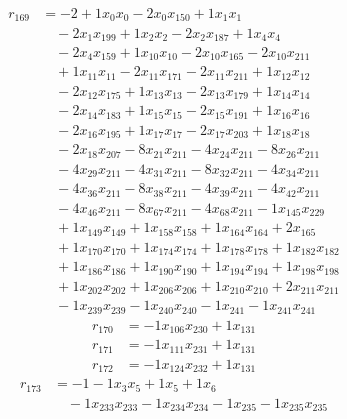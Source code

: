 \[\begin{aligned}
r_{169} &= - 2 + 1 x_{0} x_{0} - 2 x_{0} x_{150} + 1 x_{1} x_{1} \\
 &\quad - 2 x_{1} x_{199} + 1 x_{2} x_{2} - 2 x_{2} x_{187} + 1 x_{4} x_{4} \\
 &\quad - 2 x_{4} x_{159} + 1 x_{10} x_{10} - 2 x_{10} x_{165} - 2 x_{10} x_{211} \\
 &\quad + 1 x_{11} x_{11} - 2 x_{11} x_{171} - 2 x_{11} x_{211} + 1 x_{12} x_{12} \\
 &\quad - 2 x_{12} x_{175} + 1 x_{13} x_{13} - 2 x_{13} x_{179} + 1 x_{14} x_{14} \\
 &\quad - 2 x_{14} x_{183} + 1 x_{15} x_{15} - 2 x_{15} x_{191} + 1 x_{16} x_{16} \\
 &\quad - 2 x_{16} x_{195} + 1 x_{17} x_{17} - 2 x_{17} x_{203} + 1 x_{18} x_{18} \\
 &\quad - 2 x_{18} x_{207} - 8 x_{21} x_{211} - 4 x_{24} x_{211} - 8 x_{26} x_{211} \\
 &\quad - 4 x_{29} x_{211} - 4 x_{31} x_{211} - 8 x_{32} x_{211} - 4 x_{34} x_{211} \\
 &\quad - 4 x_{36} x_{211} - 8 x_{38} x_{211} - 4 x_{39} x_{211} - 4 x_{42} x_{211} \\
 &\quad - 4 x_{46} x_{211} - 8 x_{67} x_{211} - 4 x_{68} x_{211} - 1 x_{145} x_{229} \\
 &\quad + 1 x_{149} x_{149} + 1 x_{158} x_{158} + 1 x_{164} x_{164} + 2 x_{165} \\
 &\quad + 1 x_{170} x_{170} + 1 x_{174} x_{174} + 1 x_{178} x_{178} + 1 x_{182} x_{182} \\
 &\quad + 1 x_{186} x_{186} + 1 x_{190} x_{190} + 1 x_{194} x_{194} + 1 x_{198} x_{198} \\
 &\quad + 1 x_{202} x_{202} + 1 x_{206} x_{206} + 1 x_{210} x_{210} + 2 x_{211} x_{211} \\
 &\quad - 1 x_{239} x_{239} - 1 x_{240} x_{240} - 1 x_{241} - 1 x_{241} x_{241}
\end{aligned}\]
\[\begin{aligned}
r_{170} &= - 1 x_{106} x_{230} + 1 x_{131}
\end{aligned}\]
\[\begin{aligned}
r_{171} &= - 1 x_{111} x_{231} + 1 x_{131}
\end{aligned}\]
\[\begin{aligned}
r_{172} &= - 1 x_{124} x_{232} + 1 x_{131}
\end{aligned}\]
\[\begin{aligned}
r_{173} &= - 1 - 1 x_{3} x_{5} + 1 x_{5} + 1 x_{6} \\
 &\quad - 1 x_{233} x_{233} - 1 x_{234} x_{234} - 1 x_{235} - 1 x_{235} x_{235}
\end{aligned}\]
